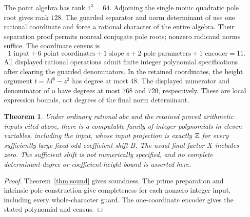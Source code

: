\documentclass[11pt,a4paper]{article}
\newtheorem{theorem}{Theorem}[section]
\begin{document}
The point algebra has rank $4^3=64$. Adjoining the single monic
quadratic pole root gives rank $128$. The guarded separator and norm
determinant of \cite{Unit} use one rational coordinate and force a
rational character of the entire algebra. Their separation proof
permits nonreal conjugate pole roots; nonzero radicand norms suffice.
The coordinate census is
\[
 1\text{ input}+6\text{ point coordinates}+1\text{ slope }z
                 +2\text{ pole parameters}+1\text{ encoder}=11.
\]
All displayed rational operations admit finite integer polynomial
specifications after clearing the guarded denominators.
In the retained coordinates, the height argument $t=M^6-z^2$ has
degree at most $48$. The displayed numerator and denominator of $u$
have degrees at most $768$ and $720$, respectively. These are local
expression bounds, not degrees of the final norm determinant.

\begin{theorem}\label{thm:eleven}
Under ordinary rational $abc$ and the retained proved arithmetic
inputs cited above, there is a computable family of integer polynomials
in eleven variables, including the input, whose input projection is
exactly $\mathbb Z$ for every sufficiently large fixed odd coefficient shift
$B$. The usual final factor $X$ includes zero. The sufficient shift
is not numerically specified, and no complete determinant-degree or
coefficient-height bound is asserted here.
\end{theorem}
\begin{proof}
Theorem~\ref{thm:sound} gives soundness. The prime preparation and
intrinsic pole construction give completeness for each nonzero integer
input, including every whole-character guard. The one-coordinate
encoder gives the stated polynomial and census.
\end{proof}
\end{document}
